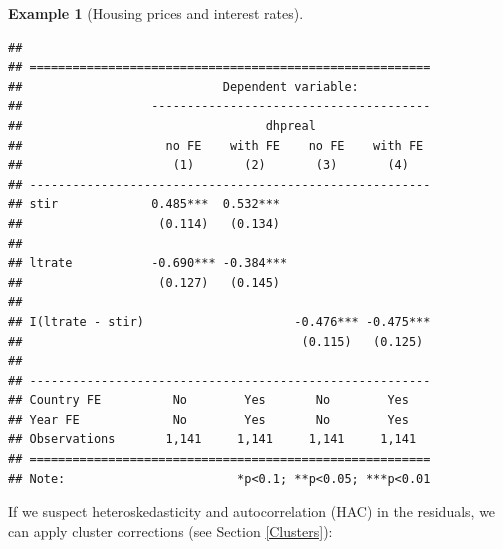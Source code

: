 \documentclass[
  12pt,
]{book}
\theoremstyle{definition}
\theoremstyle{definition}
\newtheorem{example}{Example}[chapter]
\theoremstyle{definition}
\theoremstyle{definition}
\theoremstyle{remark}
\begin{document}
\begin{example}[Housing prices and interest rates]
\begin{verbatim}
## 
## ========================================================
##                            Dependent variable:          
##                  ---------------------------------------
##                                  dhpreal                
##                    no FE    with FE    no FE    with FE 
##                     (1)       (2)       (3)       (4)   
## --------------------------------------------------------
## stir             0.485***  0.532***                     
##                   (0.114)   (0.134)                     
##                                                         
## ltrate           -0.690*** -0.384***                    
##                   (0.127)   (0.145)                     
##                                                         
## I(ltrate - stir)                     -0.476*** -0.475***
##                                       (0.115)   (0.125) 
##                                                         
## --------------------------------------------------------
## Country FE          No        Yes       No        Yes   
## Year FE             No        Yes       No        Yes   
## Observations       1,141     1,141     1,141     1,141  
## ========================================================
## Note:                        *p<0.1; **p<0.05; ***p<0.01
\end{verbatim}

If we suspect heteroskedasticity and autocorrelation (HAC) in the residuals, we can apply cluster corrections (see Section \ref{Clusters}):


\end{example}
\end{document}
